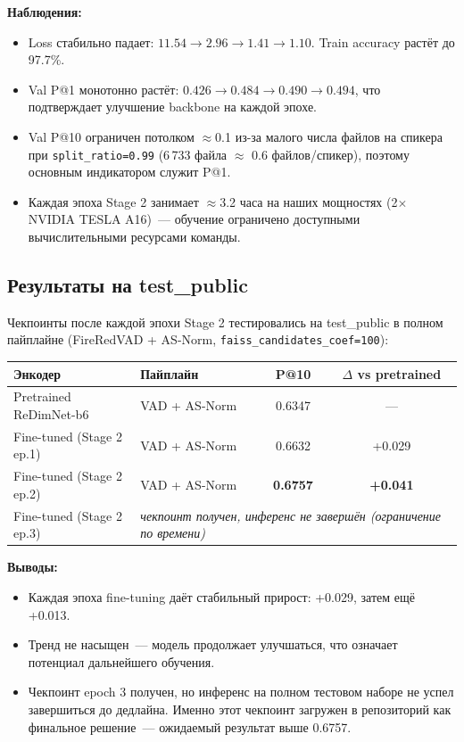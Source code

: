 \documentclass[12pt,a4paper]{article}
\begin{document}
\bigskip
\textbf{Наблюдения:}
\begin{itemize}
  \item Loss стабильно падает: $11.54 \rightarrow 2.96 \rightarrow 1.41 \rightarrow 1.10$. Train accuracy растёт до 97.7\%.
  \item Val P@1 монотонно растёт: $0.426 \rightarrow 0.484 \rightarrow 0.490 \rightarrow 0.494$, что подтверждает улучшение backbone на каждой эпохе.
  \item Val P@10 ограничен потолком $\approx$0.1 из-за малого числа файлов на спикера при \texttt{split\_ratio=0.99} (6\,733 файла $\approx$ 0.6 файлов/спикер), поэтому основным индикатором служит P@1.
  \item Каждая эпоха Stage 2 занимает $\approx$3.2 часа на наших мощностях (2$\times$ NVIDIA TESLA A16)~--- обучение ограничено доступными вычислительными ресурсами команды.
\end{itemize}

\subsection{Результаты на test\_public}

Чекпоинты после каждой эпохи Stage 2 тестировались на test\_public в полном пайплайне (FireRedVAD + AS-Norm, \texttt{faiss\_candidates\_coef=100}):

\begin{tabular}{l l c c}
\hline
Энкодер & Пайплайн & P@10 & $\Delta$ vs pretrained \\
\hline
Pretrained ReDimNet-b6 & VAD + AS-Norm & 0.6347 & --- \\
Fine-tuned (Stage 2 ep.1) & VAD + AS-Norm & 0.6632 & +0.029 \\
Fine-tuned (Stage 2 ep.2) & VAD + AS-Norm & \textbf{0.6757} & \textbf{+0.041} \\
Fine-tuned (Stage 2 ep.3) & \multicolumn{3}{l}{\emph{чекпоинт получен, инференс не завершён (ограничение по времени)}} \\
\hline
\end{tabular}

\bigskip
\textbf{Выводы:}
\begin{itemize}
  \item Каждая эпоха fine-tuning даёт стабильный прирост: +0.029, затем ещё +0.013.
  \item Тренд не насыщен~--- модель продолжает улучшаться, что означает потенциал дальнейшего обучения.
  \item Чекпоинт epoch 3 получен, но инференс на полном тестовом наборе не успел завершиться до дедлайна. Именно этот чекпоинт загружен в репозиторий как финальное решение~--- ожидаемый результат выше 0.6757.
\end{itemize}
\end{document}
